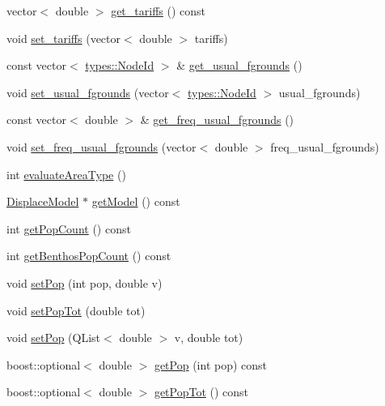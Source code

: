 \begin{DoxyCompactItemize}
vector$<$ double $>$ \mbox{\hyperlink{class_node_data_a57ef519f6170d871e72eae0adde81912}{get\+\_\+tariffs}} () const
\item 
void \mbox{\hyperlink{class_node_data_ae36ac9e76218d533a01501c8b67dc3de}{set\+\_\+tariffs}} (vector$<$ double $>$ tariffs)
\item 
const vector$<$ \mbox{\hyperlink{classtypes_1_1_node_id}{types\+::\+Node\+Id}} $>$ \& \mbox{\hyperlink{class_node_data_a280457f06e40d8c6dd86008e9de756b2}{get\+\_\+usual\+\_\+fgrounds}} ()
\item 
void \mbox{\hyperlink{class_node_data_a8bd37a5138e6ae24633994cc55d4596b}{set\+\_\+usual\+\_\+fgrounds}} (vector$<$ \mbox{\hyperlink{classtypes_1_1_node_id}{types\+::\+Node\+Id}} $>$ usual\+\_\+fgrounds)
\item 
const vector$<$ double $>$ \& \mbox{\hyperlink{class_node_data_af64b8f1fb2066a00c1f24a9618970647}{get\+\_\+freq\+\_\+usual\+\_\+fgrounds}} ()
\item 
void \mbox{\hyperlink{class_node_data_a17b4f94bb1ca20d974e800138606ae95}{set\+\_\+freq\+\_\+usual\+\_\+fgrounds}} (vector$<$ double $>$ freq\+\_\+usual\+\_\+fgrounds)
\item 
int \mbox{\hyperlink{class_node_data_ac1a8b1d3946f4103ccbb1a131ca0e87a}{evaluate\+Area\+Type}} ()
\item 
\mbox{\hyperlink{class_displace_model}{Displace\+Model}} $\ast$ \mbox{\hyperlink{class_node_data_a31b3b6b6111544d59918226d84ff2d88}{get\+Model}} () const
\item 
int \mbox{\hyperlink{class_node_data_af5fd5c15f587de431fbe7241c60392c2}{get\+Pop\+Count}} () const
\item 
int \mbox{\hyperlink{class_node_data_aac4449825ea3eb54fb679a0de01316d4}{get\+Benthos\+Pop\+Count}} () const
\item 
void \mbox{\hyperlink{class_node_data_adca5c23e611e9a1011e889cdba0adb14}{set\+Pop}} (int pop, double v)
\item 
void \mbox{\hyperlink{class_node_data_ad47e9ef6b7b0dd39c74d2996f83dcce5}{set\+Pop\+Tot}} (double tot)
\item 
void \mbox{\hyperlink{class_node_data_aa0c51ea85c2127e9b1feb9dd93be963d}{set\+Pop}} (Q\+List$<$ double $>$ v, double tot)
\item 
boost\+::optional$<$ double $>$ \mbox{\hyperlink{class_node_data_a3847bd4ee9c48cd7f7ef0352c5eee5fd}{get\+Pop}} (int pop) const
\item 
boost\+::optional$<$ double $>$ \mbox{\hyperlink{class_node_data_ab2c09a7a14aeb151ad1cabb8d009ea92}{get\+Pop\+Tot}} () const

\end{DoxyCompactItemize}
